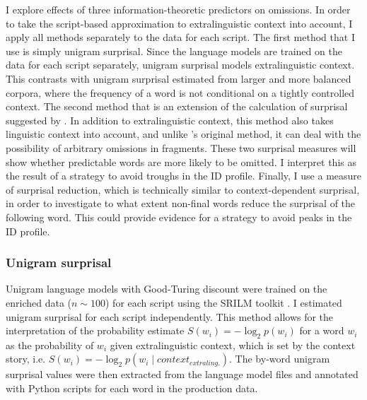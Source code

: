 I explore effects of three information-theoretic predictors on omissions. In order to take the script-based approximation to extralinguistic context into account, I apply all methods separately to the data for each script. The first method that I use is simply unigram surprisal. Since the language models are trained on the data for each script separately, unigram surprisal models extralinguistic context. This contrasts with unigram surprisal estimated from larger and more balanced corpora, where the frequency of a word is not conditional on a tightly controlled context. The second method that is an extension of the calculation of surprisal suggested by \citet{hale2001}. In addition to extralinguistic context, this method also takes linguistic context into account, and unlike \citeauthor{hale2001}'s original method, it can deal with the possibility of arbitrary omissions in fragments. These two surprisal measures will show whether predictable words are more likely to be omitted. I interpret this as the result of a strategy to avoid troughs in the ID profile. Finally, I use a measure of surprisal reduction, which is technically similar to context-dependent surprisal, in order to investigate to what extent non-final words reduce the surprisal of the following word. This could provide evidence for a strategy to avoid peaks in the ID profile.

\subsubsection{Unigram surprisal}

Unigram language models with Good-Turing discount were trained on the enriched data ($n \sim 100$) for each script using the SRILM toolkit \citep{stolcke2002}. I estimated unigram surprisal for each script independently. This method allows for the interpretation of the probability estimate $S(w_i) = -\log_2 p(w_i)$ for a word $w_i$ as the probability of $w_i$  given extralinguistic context, which is set by the context story, i.e. $S(w_i) = -\log_2 p(w_i\mathbin{|} context_{extraling.})$. The by-word unigram surprisal values were then extracted from the language model files and annotated with Python scripts for each word in the production data. 

